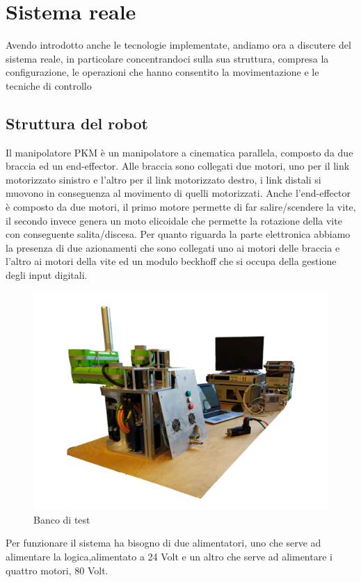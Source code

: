 \section{Sistema reale}
Avendo introdotto anche le tecnologie implementate, andiamo ora a discutere del sistema reale, in particolare concentrandoci sulla sua struttura, compresa la configurazione, le operazioni che hanno consentito la movimentazione e le tecniche di controllo
\subsection{Struttura del robot}
Il manipolatore PKM è un manipolatore a cinematica parallela, composto da due braccia ed un end-effector. Alle braccia sono collegati due motori, uno per il link motorizzato sinistro e l'altro per il link motorizzato destro, i link distali si muovono in conseguenza al movimento di quelli motorizzati. Anche l'end-effector è composto da due motori, il primo motore permette di far salire/scendere la vite, il secondo invece genera un moto elicoidale che permette la rotazione della vite con conseguente salita/discesa. 
Per quanto riguarda la parte elettronica abbiamo la presenza di due azionamenti che sono collegati uno ai motori delle braccia e l'altro ai motori della vite ed un modulo beckhoff che si occupa della gestione degli input digitali.
\begin{figure}[ht]
	\begin{center}
		\includegraphics[scale=0.6]{Immagini/Sperimentale/banco}
		\caption{Banco di test}
		\label{fig:BancoProva}
	\end{center}
\end{figure}
Per funzionare il sistema ha bisogno di due alimentatori, uno che serve ad alimentare la logica,alimentato a 24 Volt e un altro che serve ad alimentare i quattro motori, 80 Volt.
